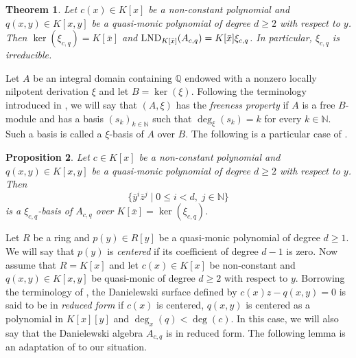 \documentclass{article}
\newcommand \Q {\mathbb{Q}}
\newcommand \N {\mathbb{N}}
\renewcommand \a {A}
\newcommand \ring {R}
\renewcommand \k {K}
\newcommand \lnd {{\rm LND}}
\newtheorem{theorem}{Theorem}
\newtheorem{proposition}[theorem]{Proposition}
\begin{document}
{\begin{theorem}\label{basisLemma}Let $c(x)\in\k[x]$ be a non-constant polynomial and $q(x,y)\in\k[x,y]$ be a quasi-monic polynomial of degree $d\geq 2$ with respect to $y$. Then $\ker(\xi_{c,q})=\k[\bar{x}]$ and $\lnd_{\k[\bar{x}]}(\a_{c,q})=\k[\bar{x}]\xi_{c,q}$. In particular, $\xi_{c,q}$ is irreducible.
\end{theorem}

Let $\a$ be an integral domain containing $\Q$ endowed with a nonzero locally nilpotent derivation $\xi$ and let $B=\ker(\xi)$. Following the terminology introduced in \cite{freudenburg_2019}, we will say that $(\a,\xi)$ has the
{\it freeness property} if $\a$ is a free $B$-module and has a basis $(s_k)_{k\in\N}$ such that $\deg_{\xi}(s_k)=k$ for every $k\in\N$. Such a basis is called a $\xi$-basis of $\a$ over $B$. The following is a particular case of \cite[Theorem 3.3]{elkahoui_2023}.

\begin{proposition}\label{xbasisProposition}Let $c\in\k[x]$ be a non-constant polynomial and $q(x,y)\in\k[x,y]$ be a quasi-monic polynomial of degree $d\geq 2$ with respect to $y$. Then 
	$$\big\{ \bar{y}^i\bar{z}^j\mid 0\leq i<d, \;j\in\N\}$$ is a $\xi_{c,q}$-basis of $\a_{c,q}$ over $\k[\bar{x}]=\ker(\xi_{c,q})$.
\end{proposition}

Let $\ring$ be a ring and $p(y)\in\ring[y]$ be a quasi-monic polynomial of degree $d\geq 1$. We will say that $p(y)$ is {\it centered} if its coefficient of degree $d-1$ is zero. Now assume that $\ring=\k[x]$ and let $c(x)\in\k[x]$ be non-constant and $q(x,y)\in\k[x,y]$ be quasi-monic of degree $d\geq 2$ with respect to $y$. Borrowing the terminology of \cite[Definition 4]{poloni_2011}, the Danielewski surface defined by $c(x)z-q(x,y)=0$ is said to be in {\it reduced form} if $c(x)$ is centered, $q(x,y)$ is centered as a polynomial in $\k[x][y]$ and $\deg_x(q)<\deg(c)$. In this case, we will also say that the Danielewski algebra $\a_{c,q}$ is in reduced form. The following lemma \cite[Lemma 3.1]{elkahouiHammi_2025} is an adaptation of \cite[Lemma 2]{poloni_2011} to our situation.


}
\end{document}
